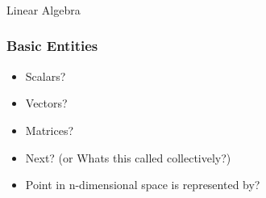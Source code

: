 \begin{frame}[fragile]\frametitle{}
\begin{center}
{\Large Linear Algebra }
\end{center}
\end{frame}

\begin{frame}[fragile]\frametitle{Basic Entities}
\begin{itemize}
\item Scalars?
\item Vectors?
\item Matrices?
\item Next? (or Whats this called collectively?)
\item Point in n-dimensional space is represented by?
\end{itemize}
\end{frame}











